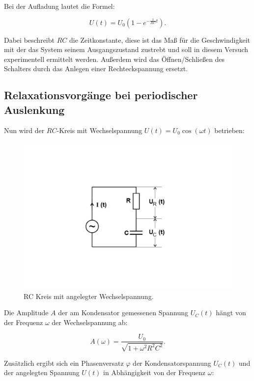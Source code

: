 Bei der Aufladung lautet die Formel:

\begin{equation}
    U(t)= U_{0}(1-e^{-\frac{1}{RC}t}).  \label{eqn:Aufladen}
\end{equation}

Dabei beschreibt $RC$ die Zeitkonstante, diese ist das Maß für die Geschwindigkeit mit der das System seinem
Ausgangszustand zustrebt und soll in diesem Versuch experimentell ermittelt werden.
Außerdem wird das Öffnen/Schließen des Schalters durch das Anlegen einer Rechteckspannung ersetzt.

\subsection{Relaxationsvorgänge bei periodischer Auslenkung}
Nun wird der $RC$-Kreis mit Wechselspannung $U(t) = U_{0}\cos(\omega t)$ betrieben:
\begin{figure}
    \centering
    \includegraphics{content/Theorie - RC-Kreis Wechselspannung.pdf}
    \caption{RC Kreis mit angelegter Wechselspannung. \cite{v353}}
    \label{fig:Theorie - RC_Kreis Wechselspannung}
\end{figure}

Die Amplitude $A$ der am Kondensator gemessenen Spannung $U_{C}(t)$ hängt von der Frequenz $\omega$ der Wechselspannung ab:

\begin{equation}
    A(\omega)= \frac{U_{0}}{\sqrt{1+\omega ^{2}R^{2}C^{2}}} . \label{eqn:Tiefpass}
\end{equation}

Zusätzlich ergibt sich ein Phasenversatz $\varphi$ der Kondensatorspannung $U_{C}(t)$ und der angelegten Spannung $U(t)$
in Abhängigkeit von der Frequenz $\omega$:

